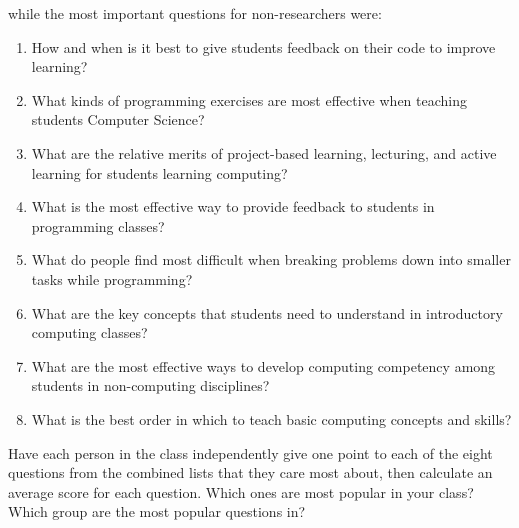 \noindent
while the most important questions for non-researchers were:

\begin{enumerate}

\item
  How and when is it best to give students feedback on their code to improve learning?

\item
  What kinds of programming exercises are most effective when teaching students Computer Science?

\item
  What are the relative merits of project-based learning, lecturing, and active learning for students learning computing?

\item
  What is the most effective way to provide feedback to students in programming classes?

\item
  What do people find most difficult when breaking problems down into smaller tasks while programming?

\item
  What are the key concepts that students need to understand in introductory computing classes?

\item
  What are the most effective ways to develop computing competency among students in non-computing disciplines?

\item
  What is the best order in which to teach basic computing concepts and skills?

\end{enumerate}

Have each person in the class independently give one point to
each of the eight questions from the combined lists that they care most about,
then calculate an average score for each question.
Which ones are most popular in your class?
Which group are the most popular questions in?
